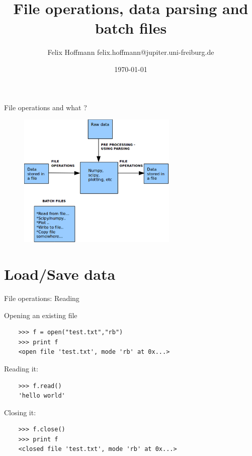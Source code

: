 \documentclass[xcolor=table,10pt]{beamer}
\title {File operations, data parsing and batch files}
\author[Felix Hoffmann]{Felix Hoffmann \vspace{0.25cm} \newline \small felix.hoffmann@jupiter.uni-freiburg.de}
\institute[BCF]{Bernstein Center Freiburg}
\date{\today}
\begin{document}




\begin{frame} 
  \titlepage
\end{frame}



\begin{frame}{File operations and what ?}

  \begin{figure}
    \centering
    \includegraphics[width=3.0in]{Fits.eps}
  \end{figure}

\end{frame}



\section{Load/Save data}

\begin{frame}[fragile]{File operations: Reading}

  Opening an existing file 

  \begin{verbatim}
    >>> f = open("test.txt","rb")
    >>> print f
    <open file 'test.txt', mode 'rb' at 0x...>
  \end{verbatim}
  \bigskip
  \pause
  Reading it:
  \begin{verbatim}
    >>> f.read()
    'hello world'
  \end{verbatim}
  \pause
  \bigskip
  Closing it:
  \begin{verbatim}
    >>> f.close()
    >>> print f
    <closed file 'test.txt', mode 'rb' at 0x...>
  \end{verbatim}

\end{frame}
\end{document}
